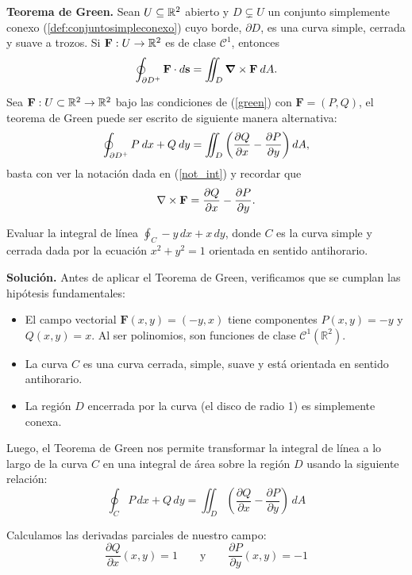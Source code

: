 \begin{theorem} \textbf{Teorema de Green.} \label{green}  Sean $U\subseteq \mathbb{R}^2$ abierto  y   $D \subsetneq  U$ un conjunto  simplemente conexo (\autoref{def:conjuntosimpleconexo}) cuyo borde, $\partial D$, es una curva simple,  cerrada y suave a trozos.  Si  $\mathbf{F}:U\to\mathbb{R}^2$ es de clase $\mathcal{C}^1$, entonces  
    \[
        \oint_{\partial D^{+}} \mathbf{F}\cdot d\mathbf{s} = \iint_D \grad\times\mathbf{F}  \: dA.
    \]
\end{theorem}

\begin{obs} Sea $\mathbf{F}:U\subset \mathbb{R}^2\to\mathbb{R}^2$ bajo las condiciones de (\ref{green})  con $\mathbf{F}=(P,Q)$,  el teorema de Green  puede ser escrito de siguiente manera alternativa:
\[
    \oint_{\partial D^+}P\:dx+Q\:dy=\iint_D\left(\dfrac{\partial Q}{\partial x}-\dfrac{\partial P}{\partial y}\right)dA,
\]
basta con ver la notaci\'on dada en (\ref{not_int}) y recordar que 
\[
    \nabla\times\mathbf{F} = \dfrac{\partial Q}{\partial x}-\dfrac{\partial P}{\partial y}.
\]
\end{obs}

\begin{example} Evaluar la integral de línea $\oint_C -y \, dx + x \, dy$, donde $C$ es la curva simple y cerrada dada por la ecuaci\'on $x^2 + y^2 = 1$ orientada en sentido antihorario.
\end{example}
\noindent\textbf{Solución.}  Antes de aplicar el Teorema de Green, verificamos que se cumplan las hipótesis fundamentales:

\begin{itemize}
    \item El campo vectorial $\mathbf{F}(x,y) = (-y, x)$ tiene componentes $P(x,y) = -y$ y $Q(x,y) = x$. Al ser polinomios, son funciones de clase $\mathcal{C}^1 (\mathbb{R}^2)$.
    \item La curva $C$  es una curva cerrada, simple, suave y está orientada en sentido antihorario.
    \item La región $D$ encerrada por la curva (el disco de radio 1) es simplemente conexa.
\end{itemize}

Luego, el  Teorema de Green nos permite transformar la integral de línea a lo largo de la curva $C$ en una integral de área  sobre la región $D$ usando la siguiente relación:
\[ \oint_C P \, dx + Q \, dy = \iint_D \left( \frac{\partial Q}{\partial x} - \frac{\partial P}{\partial y} \right) \, dA \]

Calculamos las derivadas parciales de nuestro campo:
\[ \frac{\partial Q}{\partial x}(x,y) = 1 \qquad \text{y} \qquad \frac{\partial P}{\partial y}(x,y) = -1 \]

